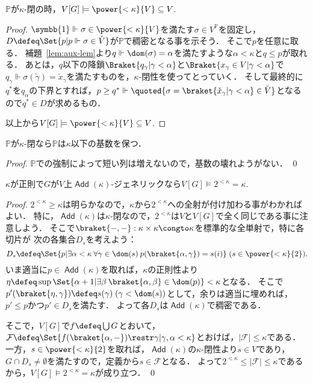 \documentclass[a4j]{ltjsarticle}
\newcommand{\mathds}[1]{\symbb{#1}}
\DeclareMathOperator{\Add}{\mathsf{Add}}
\begin{document}
\begin{lemma}
 $\mathbb{P}$が$\kappa$-閉の時，$V[G] \models \power{< \kappa}{V} \subseteq V$.
\end{lemma}
\begin{proof}
 $\mathds{1} \Vdash \sigma \in \power{<\kappa}{V}$を満たす$\sigma \in V^{\mathbb{P}}$を固定し，$D \defeq \Set{p | p \Vdash \sigma \in \check{V}}$が$\mathbb{P}$で稠密となる事を示そう．
 そこで$p$を任意に取る．
 補題~\ref{lem:aux-lem}より$q \Vdash \dom(\sigma) = \alpha$を満たすような$\alpha < \kappa$と$q \leq p$が取れる．
 あとは，$q$以下の降鎖$\Braket{q_\gamma | \gamma < \alpha}$と$\Braket{x_\gamma \in V | \gamma < \alpha}$で$q_\gamma \Vdash \sigma(\check{\gamma}) = \check{x}_\gamma$を満たすものを，$\kappa$-閉性を使ってとっていく．
 そして最終的に$q^*$を$q_\alpha$の下界とすれば，$p \geq q^* \Vdash \quoted{\sigma = \braket{\check{x}_\gamma | \gamma < \alpha} \in \check{V}}$となるので$q^* \in D$が求めるもの．

 以上から$V[G] \models \power{< \kappa}{V} \subseteq V$.
\end{proof}

\begin{corollary}
 $\mathbb{P}$が$\kappa$-閉なら$\mathbb{P}$は$\kappa$以下の基数を保つ．
\end{corollary}
\begin{proof}
 $\mathbb{P}$での強制によって短い列は増えないので，基数の壊れようがない． \qed
\end{proof}

\begin{lemma}
 $\kappa$が正則で$G$が$V$上$\Add(\kappa)$-ジェネリックなら$V[G] \models 2^{< \kappa } = \kappa$.
\end{lemma}
\begin{proof}
 $2^{< \kappa} \geq \kappa$は明らかなので，$\kappa$から$2^{<\kappa}$への全射が付け加わる事がわかればよい．
 特に，$\Add(\kappa)$は$\kappa$-閉なので，$2^{<\kappa}$は$V$と$V[G]$で全く同じである事に注意しよう．
 そこで$\braket{-, -}: \kappa \times \kappa \congto \kappa$を標準的な全単射で，特に各切片が
 次の各集合$D_s$を考えよう：
 \[
  D_s \defeq \Set{p | \exists \alpha < \kappa \: \forall \gamma \in \dom(s) \:p(\braket{\alpha, \gamma}) = s(i)}\;(s \in \power{<\kappa}{2}).
 \]
 いま適当に$p \in \Add(\kappa)$を取れば，$\kappa$の正則性より$\eta \defeq \sup \Set{\alpha+1 | \exists \beta \: \braket{\alpha, \beta} \in \dom(p)} < \kappa$となる．
 そこで$p'(\braket{\eta, \gamma}) \defeq s(\gamma)\;(\gamma < \dom(s))$として，余りは適当に埋めれば，$p' \leq p$かつ$p' \in D_s$を満たす．
 よって各$D_s$は$\Add(\kappa)$で稠密である．

 そこで，$V[G]$で$f \defeq \bigcup G$とおいて，$\mathcal{F} \defeq \Set{ f(\braket{\alpha, -}) \restr \gamma | \gamma, \alpha < \kappa}$とおけば，$|\mathcal{F}| \leq \kappa$である．
 一方，$s \in \power{<\kappa}{2}$を取れば，$\Add(\kappa)$の$\kappa$-閉性より$s \in V$であり，$G \cap D_s \neq \emptyset$を満たすので，定義から$s \in \mathcal{F}$となる．
 よって$2^{<\kappa} \leq |\mathcal{F}| \leq \kappa$であるから，$V[G] \models 2^{<\kappa} = \kappa$が成り立つ． \qed
\end{proof}
\end{document}
